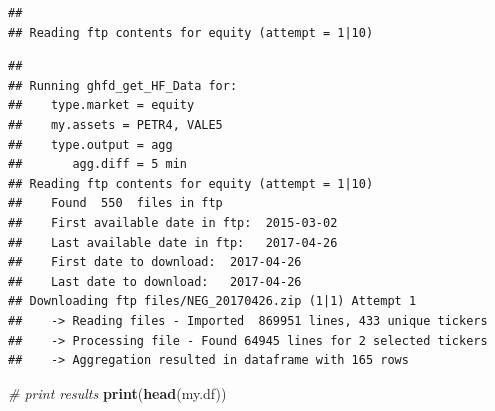 \documentclass[11pt,]{book}
\newenvironment{Shaded}{\begin{snugshade}}{\end{snugshade}}
\newcommand{\KeywordTok}[1]{\textcolor[rgb]{0.27,0.27,0.27}{\textbf{#1}}}
\newcommand{\DataTypeTok}[1]{\textcolor[rgb]{0.27,0.27,0.27}{#1}}
\newcommand{\StringTok}[1]{\textcolor[rgb]{0.5,0.5,0.5}{#1}}
\newcommand{\CommentTok}[1]{\textcolor[rgb]{0.56,0.35,0.01}{\textit{#1}}}
\newcommand{\OperatorTok}[1]{\textcolor[rgb]{0.81,0.36,0.00}{\textbf{#1}}}
\newcommand{\NormalTok}[1]{#1}
\begin{document}
\begin{verbatim}
## 
## Reading ftp contents for equity (attempt = 1|10)
\end{verbatim}

\begin{Shaded}
\end{Shaded}

\begin{verbatim}
## 
## Running ghfd_get_HF_Data for:
##    type.market = equity
##    my.assets = PETR4, VALE5
##    type.output = agg
##       agg.diff = 5 min
## Reading ftp contents for equity (attempt = 1|10)
##    Found  550  files in ftp
##    First available date in ftp:  2015-03-02
##    Last available date in ftp:   2017-04-26
##    First date to download:  2017-04-26
##    Last date to download:   2017-04-26
## Downloading ftp files/NEG_20170426.zip (1|1) Attempt 1
##    -> Reading files - Imported  869951 lines, 433 unique tickers
##    -> Processing file - Found 64945 lines for 2 selected tickers
##    -> Aggregation resulted in dataframe with 165 rows
\end{verbatim}

\begin{Shaded}
\begin{Highlighting}[]
\CommentTok{# print results}
\KeywordTok{print}\NormalTok{(}\KeywordTok{head}\NormalTok{(my.df))}
\end{Highlighting}
\end{Shaded}
\end{document}
